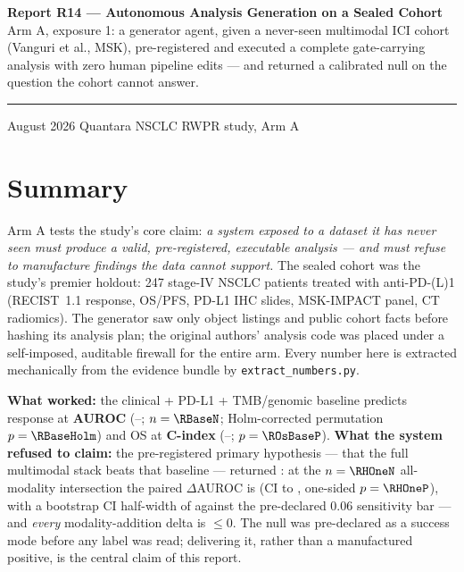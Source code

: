 \documentclass[11pt,a4paper]{article}
\begin{document}
\thispagestyle{empty}
\noindent
{\large\bfseries\color{qnavy} Report R14 --- Autonomous Analysis Generation on a Sealed Cohort}\\[2pt]
{\color{qgrey}Arm A, exposure 1: a generator agent, given a never-seen multimodal ICI cohort
(Vanguri et al., MSK), pre-registered and executed a complete gate-carrying analysis with zero
human pipeline edits --- and returned a calibrated null on the question the cohort cannot
answer.}\\[6pt]
{\color{qgrey}\rule{\textwidth}{0.4pt}}

\medskip
{} August 2026 \quad\textbullet\quad Quantara \quad\textbullet\quad
NSCLC RWPR study, Arm A

\section*{Summary}

Arm A tests the study's core claim: \emph{a system exposed to a dataset it has never seen must
produce a valid, pre-registered, executable analysis --- and must refuse to manufacture findings
the data cannot support.} The sealed cohort was the study's premier holdout: 247 stage-IV NSCLC
patients treated with anti-PD-(L)1 (RECIST~1.1 response, OS/PFS, PD-L1 IHC slides, MSK-IMPACT
panel, CT radiomics). The generator saw only object listings and public cohort facts before
hashing its analysis plan; the original authors' analysis code was placed under a self-imposed,
auditable firewall for the entire arm. Every number here is extracted mechanically from the
evidence bundle by \texttt{extract\_numbers.py}.

\textbf{What worked:} the clinical + PD-L1 + TMB/genomic baseline predicts response at
\textbf{AUROC \RBaseAuroc} (\RBaseLo--\RBaseHi; $n=\RBaseN$; Holm-corrected permutation
$p=\RBaseHolm$) and OS at \textbf{C-index \ROsBaseC} (\ROsBaseLo--\ROsBaseHi;
$p=\ROsBaseP$). \textbf{What the system refused to claim:} the pre-registered primary hypothesis
--- that the full multimodal stack beats that baseline --- returned
\textbf{\RVerdict}: at the $n=\RHOneN$ all-modality intersection the paired
$\Delta$AUROC is \RHOneDelta{} (CI \RHOneDeltaLo{} to \RHOneDeltaHi, one-sided
$p=\RHOneP$), with a bootstrap CI half-width of \RHOneHalfwidth{} against the pre-declared
0.06 sensitivity bar --- and \emph{every} modality-addition delta is $\leq 0$. The null was
pre-declared as a success mode before any label was read; delivering it, rather than a
manufactured positive, is the central claim of this report.
\end{document}
